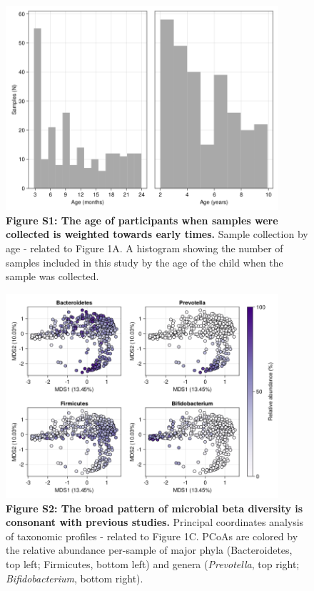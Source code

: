 \documentclass{article}
\begin{document}
\begin{figure}[h]
    \centering
    \includegraphics[width=0.9\textwidth]{assets/Supp_Figure1.png}
    \captionsetup{labelformat=empty}
    \caption{
        \textbf{Figure S1: The age of participants when samples were collected is weighted towards early times.} Sample collection by age - related to Figure 1A. A histogram showing the number of samples
        included in this study by the age of the child when the sample was collected.
    }
\end{figure}

\begin{figure}[h]
    \centering
    \includegraphics[width=0.9\textwidth]{assets/Supp_Figure2.png}
    \captionsetup{labelformat=empty}
    \caption{
        \textbf{Figure S2: The broad pattern of microbial beta diversity is consonant with previous studies.} Principal coordinates analysis of taxonomic profiles - 
        related to Figure 1C. PCoAs are colored by the relative abundance per-sample
        of major phyla (Bacteroidetes, top left; Firmicutes, bottom left)
        and genera (\textit{Prevotella}, top right; \textit{Bifidobacterium}, bottom right).
    }
\end{figure}
\end{document}
